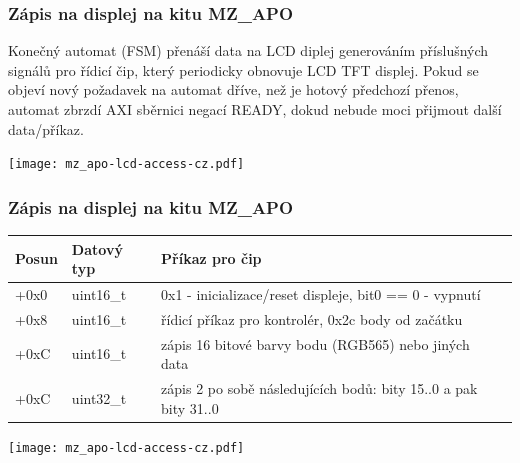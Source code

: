 \documentclass{beamer}
\begin{document}
\begin{frame}
\frametitle{Zápis na displej na kitu MZ\_APO}

Konečný automat (FSM) přenáší data na LCD diplej generováním příslušných signálů pro řídicí čip, který periodicky obnovuje LCD TFT displej.
Pokud se objeví nový požadavek na automat dříve, než je hotový předchozí přenos, automat zbrzdí AXI sběrnici negací READY, dokud nebude moci přijmout další data/příkaz.

\texttt{[image: mz\_apo-lcd-access-cz.pdf]}

\end{frame}

\begin{frame}
\frametitle{Zápis na displej na kitu MZ\_APO}

\begin{tabular}{|l|l|l|l|} \hline
Posun & \footnotesize{Datový typ} & Příkaz pro čip \\\hline
+0x0 & \footnotesize{uint16\_t} & \footnotesize{0x1 - inicializace/reset displeje, bit0 == 0 - vypnutí} \\\hline
+0x8 & \footnotesize{uint16\_t} & \footnotesize{řídicí příkaz pro kontrolér, 0x2c body od začátku} \\\hline
+0xC & \footnotesize{uint16\_t} & \footnotesize{zápis 16 bitové barvy bodu (RGB565) nebo jiných data} \\\hline
+0xC & \footnotesize{uint32\_t} & \footnotesize{zápis 2 po sobě následujících bodů: bity 15..0 a pak bity 31..0} \\\hline
\end{tabular}

\vspace{5mm}

\texttt{[image: mz\_apo-lcd-access-cz.pdf]}

\end{frame}
\end{document}
